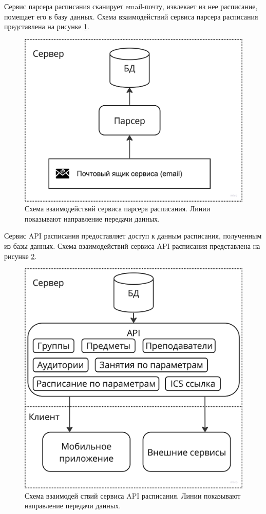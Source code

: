 Сервис парсера расписания сканирует email-почту, извлекает из нее расписание, помещает его в базу данных.
Схема взаимодействий сервиса парсера расписания представлена на рисунке \ref{fig:schemes:parser}.

\begin{figure}
  \centering
  \includegraphics[width=0.8\linewidth]{images/schemes/parser.png}
  \caption{Схема взаимодействий сервиса парсера расписания. Линии показывают направление передачи данных.}
  \label{fig:schemes:parser}
\end{figure}

Сервис API расписания предоставляет доступ к данным расписания,
полученным из базы данных. Схема взаимодействий сервиса API расписания представлена на рисунке \ref{fig:schemes:api}.

\begin{figure}
  \centering
  \includegraphics[width=0.8\linewidth]{images/schemes/api.png}
  \caption{Схема взаимодей ствий сервиса API расписания. Линии показывают направление передачи данных.}
  \label{fig:schemes:api}
\end{figure}


